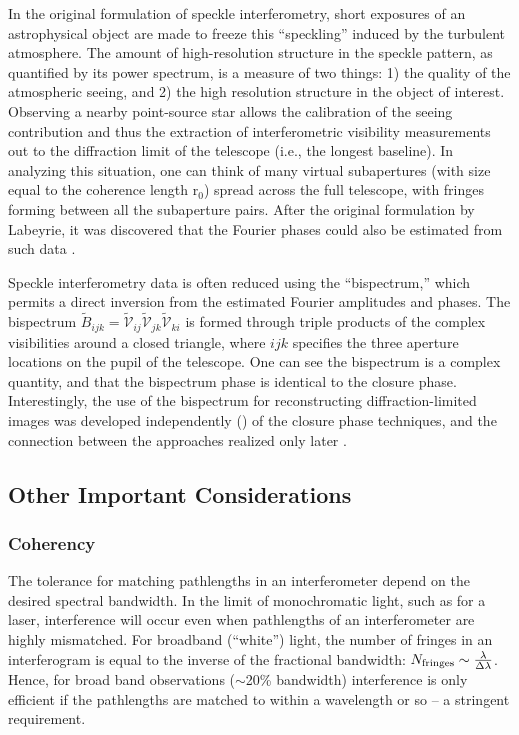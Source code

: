 \documentclass[12pt]{iopart}
\begin{document}
In the original formulation of speckle interferometry, short exposures
of an astrophysical object are made to freeze this ``speckling''
induced by the turbulent atmosphere.  The amount of high-resolution
structure in the speckle pattern, as quantified by its power spectrum,
is a measure of two things: 1) the quality of the atmospheric seeing,
and 2) the high resolution structure in the object of interest.
Observing a nearby point-source star allows the calibration of the
seeing contribution and thus the extraction of interferometric
visibility measurements out to the diffraction limit of the telescope
(i.e., the longest baseline).  In analyzing this situation, one can
think of many virtual subapertures (with size equal to the coherence
length r$_0$) spread across the full telescope, with fringes forming
between all the subaperture pairs.  After the original formulation by
Labeyrie, it was discovered that the Fourier phases could also
be estimated from such data \citep[e.g.,][]{kt74,weigelt77}.

Speckle interferometry data is often reduced using the ``bispectrum,''
which permits a direct inversion from the estimated Fourier amplitudes
and phases.  The bispectrum $\tilde{B}_{ijk}= \tilde{\mathcal V}_{ij}
\tilde{\mathcal V}_{jk}\tilde{\mathcal V}_{ki}$ is formed through
triple products of the complex visibilities around a closed triangle,
where $ijk$ specifies the three aperture locations on the pupil of the
telescope.  One can see the bispectrum is a complex quantity, and that
the bispectrum phase is identical to the closure phase.
Interestingly, the use of the bispectrum for reconstructing
diffraction-limited images was developed independently
(\citealt{weigelt77,hw93}) of the closure phase techniques, and the
connection between the approaches realized only later
\citep{roddier86,cornwell1987}.


\subsection{Other Important Considerations}

\subsubsection{Coherency}
The tolerance for matching pathlengths in an interferometer
depend on the desired spectral bandwidth.  In the limit of monochromatic
light, such as for a laser, interference will occur even when pathlengths of
an interferometer are highly mismatched.  For broadband (``white'') light,
the number of fringes in an interferogram is equal to the inverse of
the fractional bandwidth: $N_{\rm fringes} \sim \frac{\lambda}{\Delta \lambda}$.
Hence, for broad band observations ($\sim$20\% bandwidth) interference is only
efficient if the pathlengths are matched to within a wavelength or so -- 
a stringent requirement.
\end{document}
